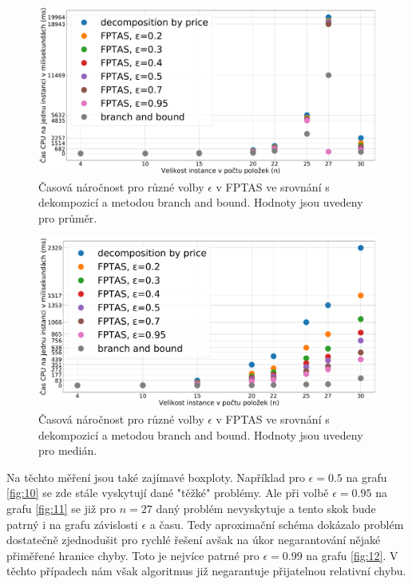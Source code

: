 \documentclass[11pt]{article}
\begin{document}
 \begin{figure}[h]\centering
	\includegraphics[scale=0.2]{img/FPTASavg}
 	\caption[2]{Časová náročnost pro různé volby $\epsilon$ v FPTAS ve srovnání s dekompozicí a metodou branch and bound. Hodnoty jsou uvedeny pro průměr.}\label{fig:8}
 \end{figure} 	
 \begin{figure}[h]\centering
	\includegraphics[scale=0.2]{img/FPTAS50}
 	\caption[2]{Časová náročnost pro různé volby $\epsilon$ v FPTAS ve srovnání s dekompozicí a metodou branch and bound. Hodnoty jsou uvedeny pro medián.}\label{fig:9}
 \end{figure} 	
 
Na těchto měření jsou také zajímavé boxploty. Například pro $\epsilon=0.5$ na grafu \ref{fig:10} se zde stále vyskytují dané "těžké" problémy. Ale při volbě $\epsilon=0.95$ na grafu \ref{fig:11} se již pro $n=27$ daný problém nevyskytuje a tento skok bude patrný i na grafu závislosti $\epsilon$ a času. Tedy aproximační schéma dokázalo problém dostatečně zjednodušit pro rychlé řešení avšak na úkor negarantování nějaké přiměřené hranice chyby. Toto je nejvíce patrné pro $\epsilon=0.99$ na grafu \ref{fig:12}. V těchto případech nám však algoritmus již negarantuje přijatelnou relativní chybu.
 
\end{document}
